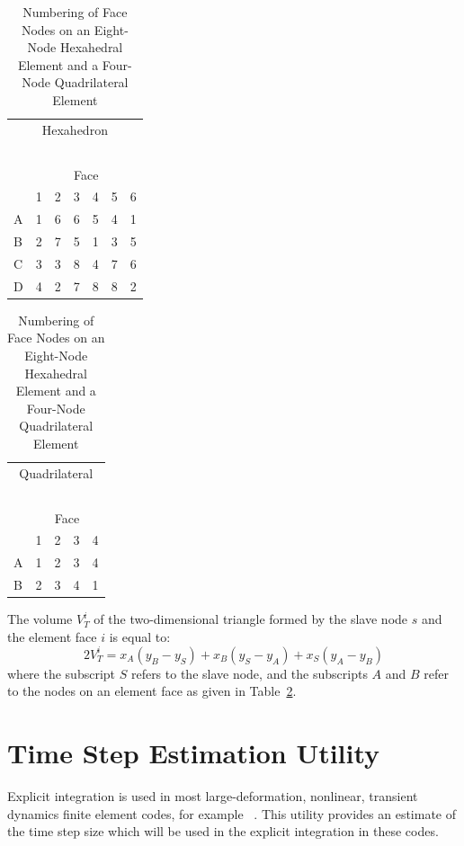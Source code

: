 \begin{table}
\parbox[t]{3.0in}{
\begin{center}
\begin{tabular}{l|cccccc}
\multicolumn{7}{c}{Hexahedron} \\
\multicolumn{7}{c}{\ } \\
  & \multicolumn{6}{c}{Face} \\
  & 1 & 2 & 3 & 4 & 5 & 6 \\ \hline
A & 1 & 6 & 6 & 5 & 4 & 1 \\
B & 2 & 7 & 5 & 1 & 3 & 5 \\
C & 3 & 3 & 8 & 4 & 7 & 6 \\
D & 4 & 2 & 7 & 8 & 8 & 2 \\
\end{tabular}
\end{center}}\hfil
\parbox[t]{3.0in}{
\begin{center}
\begin{tabular}{l|cccc}
\multicolumn{5}{c}{Quadrilateral} \\
\multicolumn{5}{c}{\ } \\
  & \multicolumn{4}{c}{Face} \\
  & 1 & 2 & 3 & 4 \\ \hline
A & 1 & 2 & 3 & 4 \\
B & 2 & 3 & 4 & 1 \\
\end{tabular}
\end{center}}
\caption{Numbering of Face Nodes on an Eight-Node Hexahedral Element and
a Four-Node Quadrilateral Element}\label{t:nodes}
\end{table}

The volume $V_T^i$ of the two-dimensional triangle formed by the
slave node $s$ and the element face $i$ is equal to:
\begin{equation}
2V_T^i = x_A (y_B - y_S) + x_B (y_S - y_A) + x_S (y_A - y_B)
\end{equation}
where the subscript $S$ refers to the slave node, and the subscripts
$A$ and $B$ refer to the nodes on an element face as given in
Table~\ref{t:nodes}.

\section{Time Step Estimation Utility}\label{sec:timestep}

Explicit integration is used in most large-deformation, nonlinear,
transient dynamics finite element codes, for example
~\cite{PRONTO2D,PRONTO3D}. This utility provides an
estimate of the time step size which will be used in the explicit
integration in these codes.

